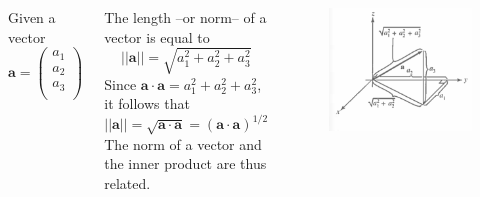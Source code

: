 \documentclass{beamer}
\begin{document}
\begin{frame}
\begin{columns}[c]
Given a vector 
$$\mathbf{a} = \left(
		\begin{array}{c}
		a_1\\
		a_2\\
		a_3\\
		\end{array}
	\right)$$

The length --or norm-- of a vector  is equal to 
$$|| \mathbf{a}  ||  = \sqrt{a_{1}^{2} + a_{2}^{2} + a_{3}^{2}}$$ 
Since $\mathbf{a} \cdot \mathbf{a} = a_{1}^{2} + a_{2}^{2} + a_{3}^{2}$, it follows that $$|| \mathbf{a} || = \sqrt{ \mathbf{a} \cdot \mathbf{a} } = \left( \mathbf{a} \cdot \mathbf{a} \right)^{1/2}$$
The norm of a vector and the inner product are thus related.

\begin{figure}[htbp]
\begin{center}
\includegraphics[width=1.1\textwidth]{fig_pyth.png}
\end{center}
\end{figure}
\end{columns}
\end{frame}
\end{document}
